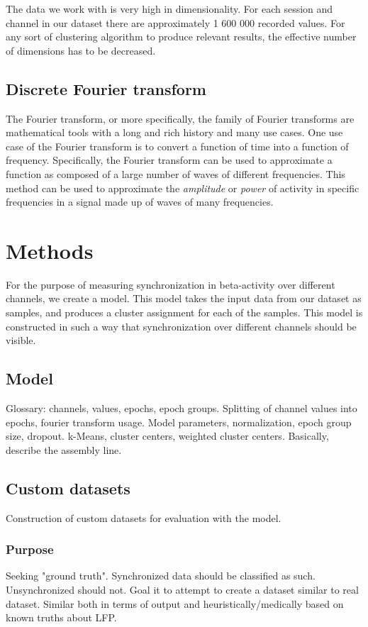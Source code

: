 \documentclass{article}
\begin{document}
The data we work with is very high in dimensionality. For each session and channel in our dataset there are approximately 1 600 000 recorded values. For any sort of clustering algorithm to produce relevant results, the effective number of dimensions has to be decreased. 

\subsection{Discrete Fourier transform}
The Fourier transform, or more specifically, the family of Fourier transforms are mathematical tools with a long and rich history and many use cases. One use case of the Fourier transform is to convert a function of time into a function of frequency. Specifically, the Fourier transform can be used to approximate a function as composed of a large number of waves of different frequencies. \citep{Fourier} This method can be used to approximate the \textit{amplitude} or \textit{power} of activity in specific frequencies in a signal made up of waves of many frequencies.

\newpage
\section{Methods}
For the purpose of measuring synchronization in beta-activity over different channels, we create a model. This model takes the input data from our dataset as samples, and produces a cluster assignment for each of the samples. This model is constructed in such a way that synchronization over different channels should be visible.

\subsection{Model}
Glossary: channels, values, epochs, epoch groups.
Splitting of channel values into epochs, fourier transform usage.
Model parameters, normalization, epoch group size, dropout.
k-Means, cluster centers, weighted cluster centers.
Basically, describe the assembly line.

\subsection{Custom datasets}
Construction of custom datasets for evaluation with the model.

\subsubsection{Purpose}
Seeking "ground truth".
Synchronized data should be classified as such.
Unsynchronized should not.
Goal it to attempt to create a dataset similar to real dataset.
Similar both in terms of output and heuristically/medically based on known truths about LFP.
\end{document}
